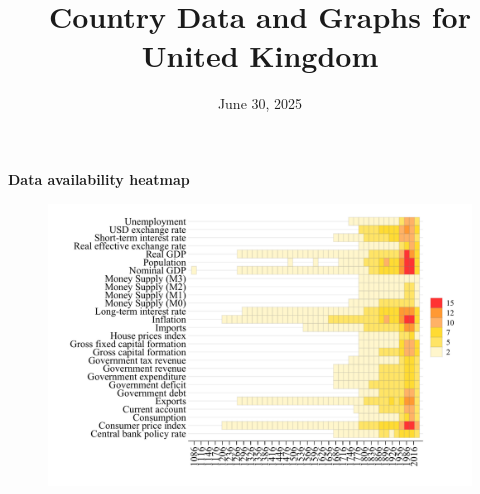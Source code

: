 \documentclass[12pt,a4paper,landscape]{article}
\begin{document}
\title{\Large Country Data and Graphs for United Kingdom}
\date{June 30, 2025}
\maketitle
\thispagestyle{empty}

\clearpage
\setcounter{page}{1}
\hypersetup{colorlinks=true,linkcolor=blue,linktoc=all}
\label{toc}
\tableofcontents
\thispagestyle{empty}
\clearpage
{}
{}
\begin{center}
{\Large\bfseries Data availability heatmap}
\end{center}
\vspace{1cm}
\begin{figure}[H]
\centering
\includegraphics[width=\textwidth,height=0.8\textheight,keepaspectratio]{graphs/GBR_heatmap.pdf}
\end{figure}
\setcounter{page}{3}
\end{document}
